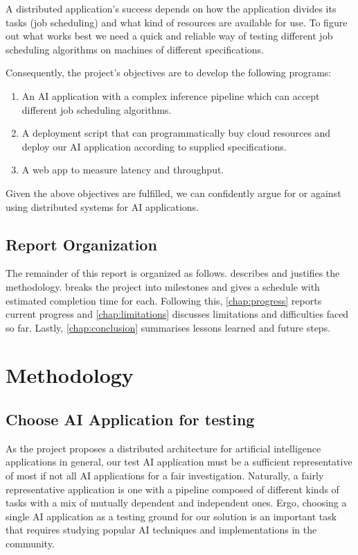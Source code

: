 \documentclass{report}
\begin{document}
A distributed application's success depends on how the application divides its tasks (job scheduling) and what kind of resources are available for use. To figure out what works best we need a quick and reliable way of testing different job scheduling algorithms on machines of different specifications.

Consequently, the project's objectives are to develop the following programs:
\begin{enumerate}
  \item An AI application with a complex inference pipeline which can accept different job scheduling algorithms.
  \item A deployment script that can programmatically buy cloud resources and deploy our AI application according to supplied specifications.
  \item A web app to measure latency and throughput.
\end{enumerate}

Given the above objectives are fulfilled, we can confidently argue for or against using distributed systems for AI applications.

\section{Report Organization}
The remainder of this report is organized as follows.  describes and justifies the methodology.  breaks the project into milestones and gives a schedule with estimated completion time for each. Following this, \cref{chap:progress} reports current progress and \cref{chap:limitations} discusses limitations and difficulties faced so far. Lastly, \cref{chap:conclusion} summarises lessons learned and future steps.

\chapter{Methodology}\label{chap:methodology}

\section{Choose AI Application for testing}
As the project proposes a distributed architecture for artificial intelligence applications in general, our test AI application must be a sufficient representative of most if not all AI applications for a fair investigation. Naturally, a fairly representative application is one with a pipeline composed of different kinds of tasks with a mix of mutually dependent and independent ones. Ergo, choosing a single AI application as a testing ground for our solution is an important task that requires studying popular AI techniques and implementations in the community.
\end{document}
